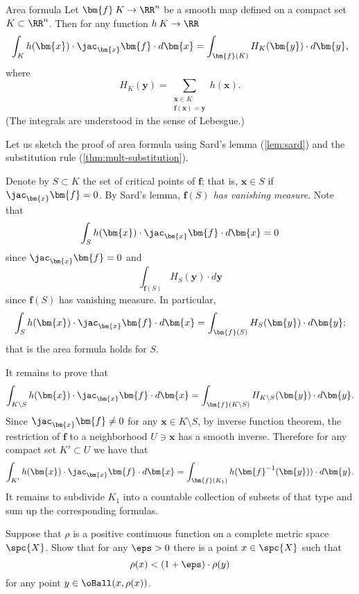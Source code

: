 \begin{thm}{Area formula}\label{thm:area-formula}
Let $\bm{f}\:K\to\RR^n$ be a smooth map defined on a compact set $K\subset \RR^n$.
Then for any function $h\:K\to \RR$
\[\int_K h(\bm{x})\cdot \jac_{\bm{x}}\bm{f}\cdot d\bm{x}=\int_{\bm{f}(K)} H_K(\bm{y})\cdot d\bm{y},\]
where 
\[H_K(\bm{y})=\sum_{\substack{\bm{x}\in K \\ \bm{f}(\bm{x})=\bm{y}}}h(\bm{x}).\]
(The integrals are understood in the sense of Lebesgue.)
\end{thm}

Let us sketch the proof of area formula using  Sard's lemma (\ref{lem:sard}) and the substitution rule (\ref{thm:mult-substitution}).

Denote by $S\subset K$ the set of critical points of $\bm{f}$; that is, $\bm{x}\in S$ if $\jac_{\bm{x}}\bm{f}=0$.
By Sard's lemma,
\emph{$\bm{f}(S)$ has vanishing measure}.
Note that 
\[\int_S h(\bm{x})\cdot \jac_{\bm{x}}\bm{f}\cdot d\bm{x}=0\]
since $\jac_{\bm{x}}\bm{f}=0$
and
\[\int_{\bm{f}(S)} H_S(\bm{y})\cdot d\bm{y}\]
since $\bm{f}(S)$ has vanishing measure.
In particular,
\[\int_S h(\bm{x})\cdot \jac_{\bm{x}}\bm{f}\cdot d\bm{x}=\int_{\bm{f}(S)} H_S(\bm{y})\cdot d\bm{y};\]
that is the area formula holds for $S$.

It remains to prove that 
\[\int_{K\setminus S} h(\bm{x})\cdot \jac_{\bm{x}}\bm{f}\cdot d\bm{x}=\int_{\bm{f}(K\setminus S)} H_{K\setminus S}(\bm{y})\cdot d\bm{y}.\]
Since $\jac_{\bm{x}}\bm{f}\ne 0$ for any $\bm{x}\in K\setminus S$, by inverse function theorem, the restriction of $\bm{f}$ to a neighborhood $U\ni\bm{x}$ has a smooth inverse.
Therefore for any compact set $K'\subset U$ we have that
\[\int_{K'}h(\bm{x})\cdot \jac_{\bm{x}}\bm{f}\cdot d\bm{x}=\int_{\bm{f}(K_1)} h(\bm{f}^{-1}(\bm{y}))\cdot d\bm{y}.\]
It remains to subdivide $K_1$ into a countable collection of subsets of that type and sum up the corresponding formulas.\qeds

















\newpage
\pagestyle{empty}

\noindent Suppose that $\rho$ is a positive continuous function on a complete metric space $\spc{X}$.
Show that for any $\eps>0$ there is a point $x\in \spc{X}$ such that 
\[\rho(x)<(1+\eps)\cdot\rho(y)\]
for any point $y\in \oBall(x,\rho(x))$.

